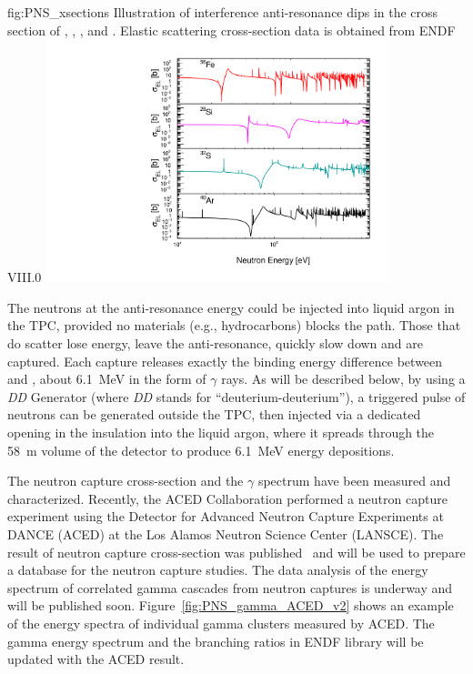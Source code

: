 \begin{dunefigure}{fig:PNS_xsections}
{Illustration of interference anti-resonance dips in the cross section of , , , and . Elastic scattering cross-section data is obtained from ENDF VIII.0}
\includegraphics[width=10cm]{graphics/PNS_xsection.pdf}
\end{dunefigure}

The neutrons at the anti-resonance energy could be injected into liquid argon in the TPC, provided no materials (e.g., hydrocarbons) blocks the path. Those that do scatter lose energy, leave the anti-resonance, quickly slow down and are captured. Each capture releases exactly the binding energy difference between  and , about \SI{6.1}{\MeV} in the form of $\gamma$ rays.  As will be described below, by using a {\it DD} Generator (where {\it DD} stands for ``deuterium-deuterium''), a triggered pulse of neutrons can be generated outside the TPC, then injected via a dedicated opening in the insulation into the liquid argon, where it spreads through the \SI{58}{\m} volume of the detector to produce \SI{6.1}{\MeV} energy depositions.

The neutron capture cross-section and the $\gamma$ spectrum have been measured and characterized. Recently, the ACED Collaboration performed a neutron capture experiment using  the Detector  for Advanced  Neutron  Capture  Experiments  at DANCE (ACED)  at the  Los  Alamos  Neutron  Science  Center  (LANSCE). The result of neutron capture cross-section was published~\cite{Fischer:2019qfr} and will be used to prepare a database for the neutron capture studies. The data analysis of the energy spectrum of correlated gamma cascades from neutron captures is underway and will be published soon. Figure~\ref{fig:PNS_gamma_ACED_v2} shows an example of the energy spectra of individual gamma clusters measured by ACED. The gamma energy spectrum and the branching ratios in ENDF library will be updated with the ACED result. 

